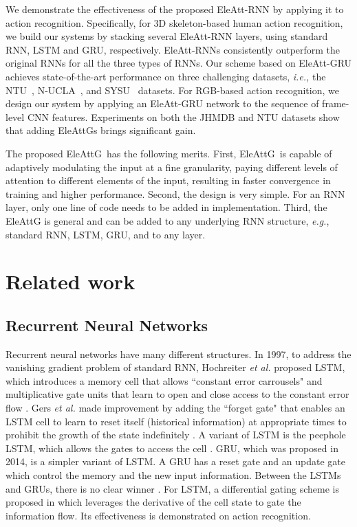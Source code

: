 \documentclass[runningheads]{llncs}
\newcommand{\EleAttGn}{{EleAttG}}
\newcommand{\EleAttG}{{EleAttG~}}
\begin{document}
{	We demonstrate the effectiveness of the proposed EleAtt-RNN by applying it to action recognition. Specifically, for 3D skeleton-based human action recognition, we build our systems by stacking several EleAtt-RNN layers, using standard RNN, LSTM and GRU, respectively. EleAtt-RNNs consistently outperform the original RNNs for all the three types of RNNs. Our scheme based on EleAtt-GRU achieves state-of-the-art performance on three challenging datasets, {\it i.e.,} the NTU~\cite{Shahroudy_2016_CVPR}, N-UCLA~\cite{wang2014cross}, and SYSU~\cite{hu2015jointly} datasets. For RGB-based action recognition, we design our system by applying an EleAtt-GRU network to the sequence of frame-level CNN features. Experiments on both the JHMDB \cite{jhuang2013towards} and NTU \cite{Shahroudy_2016_CVPR} datasets show that adding {\EleAttGn}s brings significant gain.     
	
	
	
	The proposed \EleAttG has the following merits. First, \EleAttG is capable of adaptively modulating the input at a fine granularity, paying different levels of attention to different elements of the input, resulting in faster convergence in training and higher performance. Second, the design is very simple. For an RNN layer, only one line of code needs to be added in implementation. Third, the EleAttG is general and can be added to any underlying RNN structure, {\it e.g.}, standard RNN, LSTM, GRU, and to any layer.      
	
	\section{Related work}
	\subsection{Recurrent Neural Networks}
	
	Recurrent neural networks have many different structures. In 1997, to address the vanishing gradient problem of standard RNN, Hochreiter {\it et al.} proposed LSTM, which introduces a memory cell that allows ``constant error carrousels" and multiplicative gate units that learn to open and close access to the constant error flow \cite{hochreiter1997long}. Gers {\it et al.} made improvement by adding the ``forget gate" that enables an LSTM cell to learn to reset itself (historical information) at appropriate times to prohibit the growth of the state indefinitely \cite{gers1999learning}. A variant of LSTM is the peephole LSTM, which allows the gates to access the cell \cite{gers2002learning}. GRU, which was proposed in 2014, is a simpler variant of LSTM. A GRU has a reset gate and an update gate which control the memory and the new input information. Between the LSTMs and GRUs, there is no clear winner \cite{chung2014empirical,jozefowicz2015empirical}. For LSTM, a differential gating scheme is proposed in \cite{veeriah2015differential} which leverages the derivative of the cell state to gate the information flow. Its effectiveness is demonstrated on action recognition. 
	
}
\end{document}
